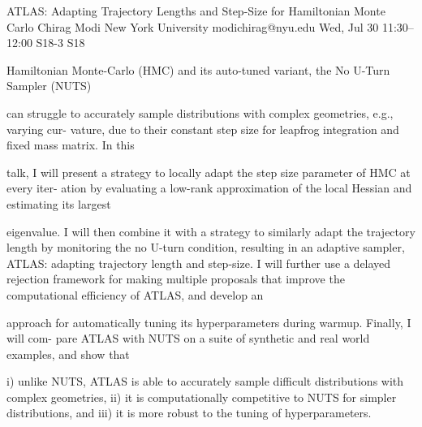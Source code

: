 \begin{talk}
  {ATLAS: Adapting Trajectory Lengths and Step-Size for Hamiltonian Monte Carlo}%
  {Chirag Modi}%
  {New York University}%
  {modichirag@nyu.edu}%
  {}%
  {}%
  {Wed, Jul 30 11:30--12:00}%
  {S18-3}%
  {S18}%
  {}%
  
    

Hamiltonian Monte-Carlo (HMC) and its auto-tuned variant, the No U-Turn Sampler (NUTS)

can struggle to accurately sample distributions with complex geometries, e.g., varying cur-
vature, due to their constant step size for leapfrog integration and fixed mass matrix. In this

talk, I will present a strategy to locally adapt the step size parameter of HMC at every iter-
ation by evaluating a low-rank approximation of the local Hessian and estimating its largest

eigenvalue. I will then combine it with a strategy to similarly adapt the trajectory length
by monitoring the no U-turn condition, resulting in an adaptive sampler, ATLAS: adapting
trajectory length and step-size. I will further use a delayed rejection framework for making
multiple proposals that improve the computational efficiency of ATLAS, and develop an

approach for automatically tuning its hyperparameters during warmup. Finally, I will com-
pare ATLAS with NUTS on a suite of synthetic and real world examples, and show that

i) unlike NUTS, ATLAS is able to accurately sample difficult distributions with complex
geometries, ii) it is computationally competitive to NUTS for simpler distributions, and iii)
it is more robust to the tuning of hyperparameters.
\medskip

\end{talk}

